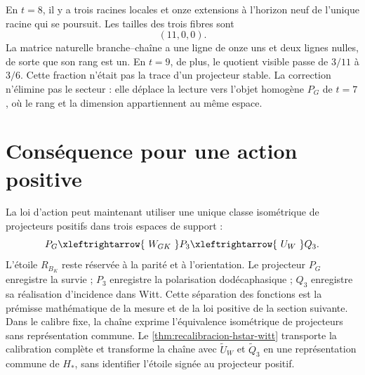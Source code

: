 En \(t=8\), il y a trois racines locales et onze extensions à l'horizon neuf de
l'unique racine qui se poursuit. Les tailles des trois fibres sont
\[
 (11,0,0).
\]
La matrice naturelle branche--chaîne a une ligne de onze uns et deux lignes
nulles, de sorte que son rang est un. En \(t=9\), de plus, le quotient visible
passe de \(3/11\) à \(3/6\). Cette fraction n'était pas la trace d'un
projecteur stable. La correction n'élimine pas le secteur : elle déplace la lecture
vers l'objet homogène \(P_G\) de \(t=7\), où le rang et la dimension
appartiennent au même espace.

\section{Conséquence pour une action positive}

La loi d'action peut maintenant utiliser une unique classe isométrique de projecteurs
positifs dans trois espaces de support :
\[
 P_G
 \xleftrightarrow{\ W_{GK}\ }
 P_3
 \xleftrightarrow{\ U_W\ }
 Q_3.
\]
L'étoile \(R_{B_K}\) reste réservée à la parité et à l'orientation. Le
projecteur \(P_G\) enregistre la survie ; \(P_3\) enregistre la polarisation
dodécaphasique ; \(Q_3\) enregistre sa réalisation d'incidence dans Witt. Cette
séparation des fonctions est la prémisse mathématique de la mesure et de la loi
positive de la section suivante. Dans le calibre fixe, la chaîne exprime
l'équivalence isométrique de projecteurs sans représentation commune. Le
\cref{thm:recalibracion-hstar-witt} transporte la calibration complète et
transforme la chaîne avec \(\widetilde U_W\) et \(\widetilde Q_3\) en une
représentation commune de \(H_*\), sans identifier l'étoile signée au
projecteur positif.
